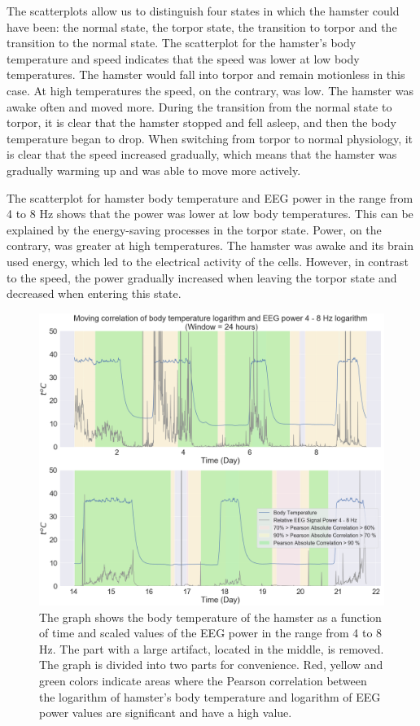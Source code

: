\documentclass[14pt,a4paper]{scrartcl}
\begin{document}
The scatterplots allow us to distinguish four states in which the hamster could have been: the normal state, the torpor state, the transition to torpor and the transition to the normal state. The scatterplot for the hamster’s body temperature and speed indicates that the speed was lower at low body temperatures. The hamster would fall into torpor and remain motionless in this case. At high temperatures the speed, on the contrary, was low. The hamster was awake often and moved more. During the transition from the normal state to torpor, it is clear that the hamster stopped and fell asleep, and then the body temperature began to drop. When switching from torpor to normal physiology, it is clear that the speed increased gradually, which means that the hamster was gradually warming up and was able to move more actively. 

The scatterplot for hamster body temperature and EEG power in the range from 4 to 8 Hz shows that the power was lower at low body temperatures. This can be explained by the energy-saving processes in the torpor state. Power, on the contrary, was greater at high temperatures. The hamster was awake and its brain used energy, which led to the electrical activity of the cells. However, in contrast to the speed, the power gradually increased when leaving the torpor state and decreased when entering this state. 

\begin{figure}[H]
\centering
\includegraphics[width=0.7\linewidth]{exp1_7.png}
\caption{The graph shows the body temperature of the hamster as a function of time and scaled values of the EEG power in the range from 4 to 8 Hz. The part with a large artifact, located in the middle, is removed. The graph is divided into two parts for convenience. Red, yellow and green colors indicate areas where the Pearson correlation between the logarithm of hamster's body temperature and logarithm of EEG power values are significant and have a high value. }\label{fig:exp1_7}
\end{figure}
\end{document}
